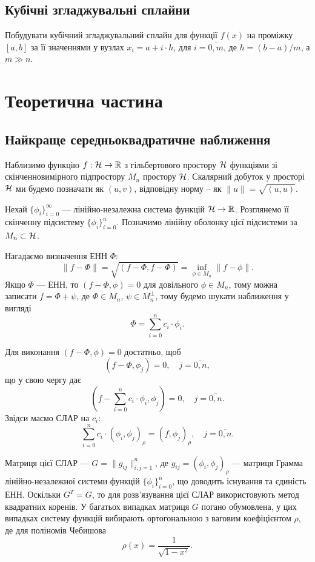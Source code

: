 \subsection{Кубічні згладжувальні сплайни}

Побудувати кубічний згладжувальний  сплайн для функції $f(x)$ на проміжку $[a, b]$ за її значеннями у вузлах $x_i = a + i \cdot h$, для $i = \overline{0, m}$, де $h = (b - a) / m$, а $m \gg n$.

\section{Теоретична частина}

\subsection{Найкраще середньоквадратичне наближення}

Наблизимо функцію $f: \mathcal{H} \to \mathbb{R}$ з гільбертового простору $\mathcal{H}$ функціями зі скінченновимірного підпростору $M_n$ простору $\mathcal{H}$. Скалярний добуток у просторі $\mathcal{H}$ ми будемо позначати як $(u, v)$, відповідну норму -- як $\|u\| = \sqrt{(u, u)}$. \medskip

Нехай $\{\phi_i\}_{i=0}^\infty$ --- лінійно-незалежна система функцій $\mathcal{H} \to \mathbb{R}$. Розглянемо її скінченну підсистему $\{\phi_i\}_{i=0}^n$. Позначимо лінійну оболонку цієї підсистеми за $M_n \subset \mathcal{H}$. \medskip

Нагадаємо визначення ЕНН $\Phi$: \[ \|f - \Phi\| = \sqrt{(f - \Phi, f - \Phi)} = \inf_{\phi \in M_n} \|f - \phi\|. \] Якщо $\Phi$ --- ЕНН, то $(f - \Phi, \phi) = 0$ для довільного $\phi \in M_n$, тому можна записати $f = \Phi + \psi$, де $\Phi \in M_n$, $\psi \in M_n^\perp$, тому будемо шукати наближення у вигляді \[ \Phi = \sum_{i = 0}^n c_i \cdot \phi_i. \]

Для виконання $(f - \Phi, \phi) = 0$ достатньо, щоб \[ (f - \Phi, \phi_j) = 0, \quad j = \overline{0, n}, \] що у свою чергу дає \[ \left(f - \sum_{i = 0}^n c_i \cdot \phi_i, \phi_j \right) = 0, \quad j = \overline{0, n}. \] Звідси маємо СЛАР на $c_i$: \[ \sum_{i=0}^n c_i \cdot (\phi_i, \phi_j)_\rho = (f, \phi_j)_\rho, \quad j = \overline{0, n}. \]

Матриця цієї СЛАР --- $G = \|g_{ij}\|_{i,j=1}^{n}$, де $g_{ij} = (\phi_i, \phi_j)_\rho$ --- матриця Грамма лінійно-незалежної системи функцій $\{\phi_i\}_{i=0}^n$, що доводить існування та єдиність ЕНН. Оскільки $G^T = G$, то для роз\-в'яз\-у\-ва\-ння цієї СЛАР використовують метод квадратних коренів. У багатьох випадках матриця $G$ погано обумовлена, у цих випадках систему функцій вибирають ортогональною з ваговим коефіцієнтом $\rho$, де для поліномів Чебишова \[ \rho(x) = \frac{1}{\sqrt{1 - x^2}}. \]

